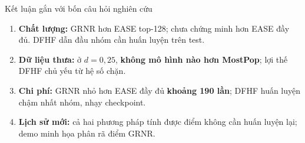 \begin{frame}{Kết luận gắn với bốn câu hỏi nghiên cứu}
\small
\begin{enumerate}\setlength\itemsep{0.29cm}
\item \textbf{Chất lượng:} GRNR hơn EASE top-128; chưa chứng minh hơn EASE đầy đủ. DFHF dẫn đầu nhóm cần huấn luyện trên test.
\item \textbf{Dữ liệu thưa:} ở $d=0{,}25$, \textbf{không mô hình nào hơn MostPop}; lợi thế DFHF chủ yếu từ hệ số chặn.
\item \textbf{Chi phí:} GRNR nhỏ hơn EASE đầy đủ \textbf{khoảng 190 lần}; DFHF huấn luyện chậm nhất nhóm, nhạy checkpoint.
\item \textbf{Lịch sử mới:} cả hai phương pháp tính được điểm không cần huấn luyện lại; demo minh họa phân rã điểm GRNR.
\end{enumerate}
\vspace{0.12cm}
\end{frame}

